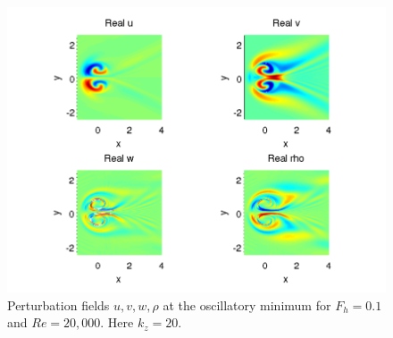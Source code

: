 \begin{figure}
\begin{center}
\includegraphics[width=\textwidth]{velocity_fields_kz_20}
\caption{Perturbation fields $u,v,w,\rho$ at the oscillatory minimum for $F_{h}=0.1$ and $Re=20{,}000$. Here $k_{z}=20$.}
\end{center}
\label{oscillation_fields}
\end{figure} 

